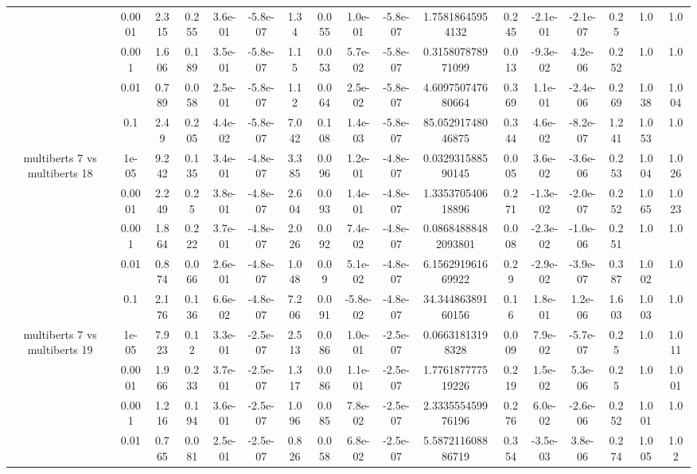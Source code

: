 \begin{tabular}{|c|c|c|c|c|c|c|c|c|c|c|c|c|c|c|c|c|}
 & 0.0001 & 2.315 & 0.255 & 3.6e-01 & -5.8e-07 & 1.34 & 0.055 & 1.0e-01 & -5.8e-07 & 1.75818645954132 & 0.245 & -2.1e-01 & -2.1e-07 & 0.25 & 1.0 & 1.0 \\
 & 0.001 & 1.606 & 0.189 & 3.5e-01 & -5.8e-07 & 1.15 & 0.053 & 5.7e-02 & -5.8e-07 & 0.315807878971099 & 0.013 & -9.3e-02 & 4.2e-06 & 0.252 & 1.0 & 1.0 \\
 & 0.01 & 0.789 & 0.058 & 2.5e-01 & -5.8e-07 & 1.12 & 0.064 & 2.5e-02 & -5.8e-07 & 4.609750747680664 & 0.369 & 1.1e-01 & -2.4e-06 & 0.269 & 1.038 & 1.004 \\
 & 0.1 & 2.49 & 0.205 & 4.4e-02 & -5.8e-07 & 7.042 & 0.108 & 1.4e-03 & -5.8e-07 & 85.05291748046875 & 0.344 & 4.6e-02 & -8.2e-07 & 1.241 & 1.053 & 1.0 \\
\hline
\multirow{5}{*}{multiberts 7 vs multiberts 18} & 1e-05 & 9.242 & 0.135 & 3.4e-01 & -4.8e-07 & 3.385 & 0.096 & 1.2e-01 & -4.8e-07 & 0.032931588590145 & 0.005 & 3.6e-02 & -3.6e-06 & 0.253 & 1.004 & 1.026 \\
 & 0.0001 & 2.249 & 0.25 & 3.8e-01 & -4.8e-07 & 2.604 & 0.093 & 1.4e-01 & -4.8e-07 & 1.335370540618896 & 0.271 & -1.3e-02 & -2.0e-07 & 0.252 & 1.065 & 1.023 \\
 & 0.001 & 1.864 & 0.222 & 3.7e-01 & -4.8e-07 & 2.026 & 0.092 & 7.4e-02 & -4.8e-07 & 0.08684888482093801 & 0.008 & -2.3e-02 & -1.0e-06 & 0.251 & 1.0 & 1.0 \\
 & 0.01 & 0.874 & 0.066 & 2.6e-01 & -4.8e-07 & 1.048 & 0.09 & 5.1e-02 & -4.8e-07 & 6.156291961669922 & 0.29 & -2.9e-02 & -3.9e-07 & 0.387 & 1.002 & 1.0 \\
 & 0.1 & 2.176 & 0.136 & 6.6e-02 & -4.8e-07 & 7.206 & 0.091 & -5.8e-02 & -4.8e-07 & 34.34486389160156 & 0.16 & 1.8e-01 & 1.2e-06 & 1.603 & 1.003 & 1.0 \\
\hline
\multirow{5}{*}{multiberts 7 vs multiberts 19} & 1e-05 & 7.923 & 0.12 & 3.3e-01 & -2.5e-07 & 2.513 & 0.086 & 1.0e-01 & -2.5e-07 & 0.06631813198328 & 0.009 & 7.9e-02 & -5.7e-07 & 0.25 & 1.0 & 1.011 \\
 & 0.0001 & 1.966 & 0.233 & 3.7e-01 & -2.5e-07 & 1.317 & 0.086 & 1.1e-01 & -2.5e-07 & 1.776187777519226 & 0.219 & 1.5e-02 & 5.3e-06 & 0.25 & 1.0 & 1.001 \\
 & 0.001 & 1.216 & 0.194 & 3.6e-01 & -2.5e-07 & 1.096 & 0.085 & 7.8e-02 & -2.5e-07 & 2.333555459976196 & 0.276 & 6.0e-02 & -2.6e-06 & 0.252 & 1.001 & 1.0 \\
 & 0.01 & 0.765 & 0.081 & 2.5e-01 & -2.5e-07 & 0.826 & 0.058 & 6.8e-02 & -2.5e-07 & 5.587211608886719 & 0.354 & -3.5e-03 & 3.8e-06 & 0.274 & 1.005 & 1.02 \\

\end{tabular}
